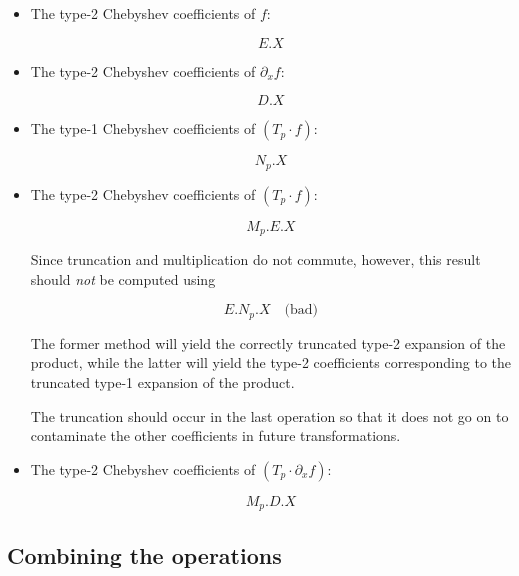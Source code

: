 \documentclass{article}
\begin{document}
\begin{itemize}
    \item The type-2 Chebyshev coefficients of $f$:
    
    \begin{equation*}
    E.X
    \end{equation*}
    
    \item The type-2 Chebyshev coefficients of $\partial_x f$:
    
    \begin{equation*}
    D.X
    \end{equation*}
    
    \item The type-1 Chebyshev coefficients of $(T_p \cdot f)$:
    
    \begin{equation*}
    N_p.X
    \end{equation*}
    
    \item The type-2 Chebyshev coefficients of $(T_p \cdot f)$:

    \begin{equation*}
    M_p.E.X
    \end{equation*}

    Since truncation and multiplication do not commute, however, this result should \emph{not} be computed using
     
    \begin{equation}
    E.N_p.X \quad \textrm{(bad)}
    \end{equation}

    The former method will yield the correctly truncated type-2 expansion of the product, while the latter will yield the type-2 coefficients corresponding to the truncated type-1 expansion of the product.  
    
    The truncation should occur in the last operation so that it does not go on to contaminate the other coefficients in future transformations. 
    
    \item The type-2 Chebyshev coefficients of $(T_p \cdot \partial_x f)$:
    
    \begin{equation*}
    M_p.D.X
    \end{equation*}
\end{itemize}

\subsection{Combining the operations}
\end{document}
